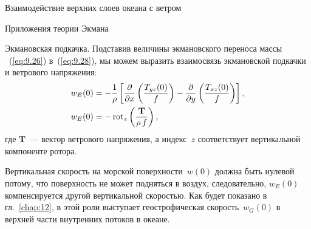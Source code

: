 \begin{chapter}{Взаимодействие верхних слоев океана с ветром}
\begin{section}{Приложения теории Экмана}
\begin{paragraph}{Экмановская подкачка.}
Подставив величины экмановского переноса массы%
~(\ref{eq:9.26}) в~(\ref{eq:9.28}),
мы можем выразить взаимосвязь экмановской подкачки 
и ветрового напряжения:
\begin{subequations}
\begin{align}
 w_E(0)
  &=-\frac{1}{\rho}\left[ 
       \frac{\partial}{\partial{x}}\left( \frac{T_{yz}(0)}{f}\right) 
        - \frac{\partial}{\partial{y}} \left( \frac{T_{xz}(0)}{f} \right) \right], \\ 
 w_E(0) &=-\mathop{\mathrm{rot}}\nolimits_z  \left( \frac{\mathbf{T}}{\rho\,f} \right),
\end{align}
\end{subequations}
где $\mathbf{T}$~--- вектор ветрового напряжения, а индекс~$z$
соответствует вертикальной компоненте ротора.
%

Вертикальная скорость на морской поверхности~$w(0)$ должна быть нулевой потому, 
что поверхность не может подняться в воздух, следовательно, $w_E(0)$ 
компенсируется другой вертикальной скоростью. Как будет показано 
в гл.~\ref{chap:12}, в этой роли выступает 
геострофическая
скорость~$w_G(0)$ в верхней части внутренних потоков в океане.
%


\end{paragraph}
\end{section}
\end{chapter}
